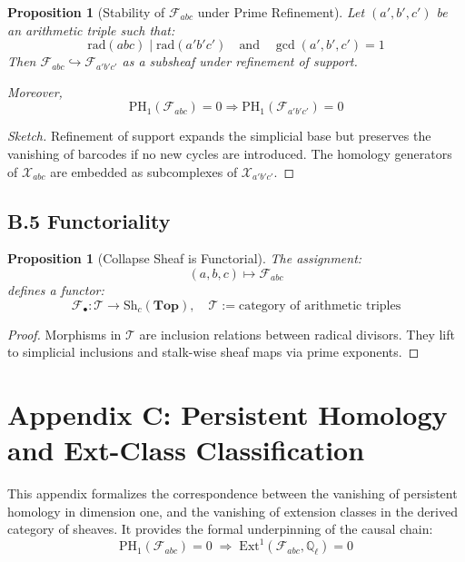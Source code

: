 \documentclass[11pt]{article}
\newtheorem{proposition}[theorem]{Proposition}
\begin{document}
\begin{proposition}[Stability of \( \mathcal{F}_{abc} \) under Prime Refinement]
Let \( (a',b',c') \) be an arithmetic triple such that:
\[
\mathrm{rad}(abc) \mid \mathrm{rad}(a'b'c') \quad \text{and} \quad \gcd(a',b',c')=1
\]
Then \( \mathcal{F}_{abc} \hookrightarrow \mathcal{F}_{a'b'c'} \) as a subsheaf under refinement of support.

Moreover,
\[
\mathrm{PH}_1(\mathcal{F}_{abc}) = 0 \Rightarrow \mathrm{PH}_1(\mathcal{F}_{a'b'c'}) = 0
\]
\end{proposition}

\begin{proof}[Sketch]
Refinement of support expands the simplicial base but preserves the vanishing of barcodes if no new cycles are introduced.  
The homology generators of \( \mathcal{X}_{abc} \) are embedded as subcomplexes of \( \mathcal{X}_{a'b'c'} \).
\end{proof}

\subsection*{B.5 Functoriality}

\begin{proposition}[Collapse Sheaf is Functorial]
The assignment:
\[
(a,b,c) \mapsto \mathcal{F}_{abc}
\]
defines a functor:
\[
\mathcal{F}_\bullet : \mathcal{T} \to \mathrm{Sh}_c(\mathbf{Top}), \quad \mathcal{T} := \text{category of arithmetic triples}
\]
\end{proposition}

\begin{proof}
Morphisms in \( \mathcal{T} \) are inclusion relations between radical divisors.  
They lift to simplicial inclusions and stalk-wise sheaf maps via prime exponents.
\end{proof}



\section*{Appendix C: Persistent Homology and Ext-Class Classification}

This appendix formalizes the correspondence between the vanishing of persistent homology in dimension one,  
and the vanishing of extension classes in the derived category of sheaves.  
It provides the formal underpinning of the causal chain:
\[
\mathrm{PH}_1(\mathcal{F}_{abc}) = 0 \;\Rightarrow\; \mathrm{Ext}^1(\mathcal{F}_{abc}, \mathbb{Q}_\ell) = 0
\]
\end{document}
